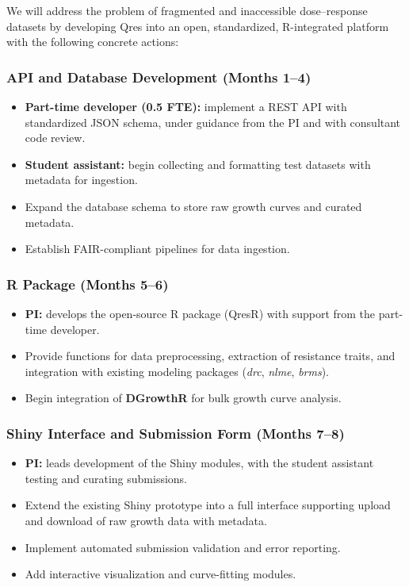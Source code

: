 \documentclass[
  letterpaper,
  DIV=11,
  numbers=noendperiod]{scrartcl}
\providecommand{\tightlist}{%
  \setlength{\itemsep}{0pt}\setlength{\parskip}{0pt}}
\begin{document}
We will address the problem of fragmented and inaccessible
dose--response datasets by developing Qres into an open, standardized,
R-integrated platform with the following concrete actions:

\subsubsection{API and Database Development (Months
1--4)}\label{api-and-database-development-months-14}

\begin{itemize}
\tightlist
\item
  \textbf{Part-time developer (0.5 FTE):} implement a REST API with
  standardized JSON schema, under guidance from the PI and with
  consultant code review.
\item
  \textbf{Student assistant:} begin collecting and formatting test
  datasets with metadata for ingestion.
\item
  Expand the database schema to store raw growth curves and curated
  metadata.
\item
  Establish FAIR-compliant pipelines for data ingestion.
\end{itemize}

\subsubsection{R Package (Months 5--6)}\label{r-package-months-56}

\begin{itemize}
\tightlist
\item
  \textbf{PI:} develops the open-source R package (QresR) with support
  from the part-time developer.
\item
  Provide functions for data preprocessing, extraction of resistance
  traits, and integration with existing modeling packages (\emph{drc},
  \emph{nlme}, \emph{brms}).
\item
  Begin integration of \textbf{DGrowthR} for bulk growth curve analysis.
\end{itemize}

\subsubsection{Shiny Interface and Submission Form (Months
7--8)}\label{shiny-interface-and-submission-form-months-78}

\begin{itemize}
\tightlist
\item
  \textbf{PI:} leads development of the Shiny modules, with the student
  assistant testing and curating submissions.
\item
  Extend the existing Shiny prototype into a full interface supporting
  upload and download of raw growth data with metadata.
\item
  Implement automated submission validation and error reporting.
\item
  Add interactive visualization and curve-fitting modules.
\end{itemize}
\end{document}
